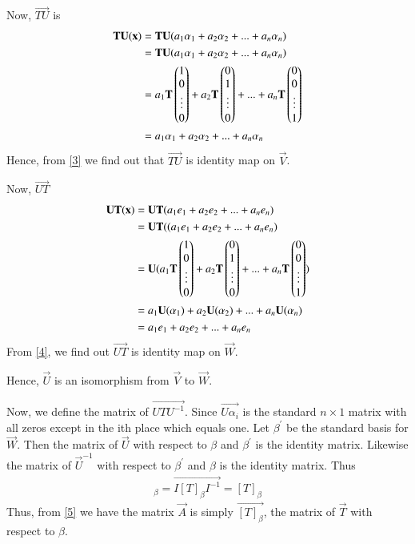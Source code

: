\documentclass[journal,12pt,twocolumn]{IEEEtran}
\begin{document}
Now, $\vec{TU}$ is
\begin{align}
\mathbf{TU(x)} & = \mathbf{TU}(a_1\alpha_{1} + a_2\alpha_{2} + ... + a_n\alpha_{n}) \\
            & = \mathbf{T}\mathbf{U}(a_1\alpha_{1} + a_2\alpha_{2} + ... + a_n\alpha_{n}) \\ 
            & = a_1\mathbf{T}\begin{pmatrix}1 \\ 0 \\ \vdots \\0\end{pmatrix} + a_2\mathbf{T}\begin{pmatrix}0 \\ 1 \\ \vdots \\0\end{pmatrix} + ... + a_n\mathbf{T}\begin{pmatrix}0 \\ 0 \\ \vdots \\1\end{pmatrix} \\
            & = a_1\alpha_{1} + a_2\alpha_{2} + ... + a_n\alpha_{n} \label{3}
\end{align}
Hence, from \eqref{3} we find out that $\vec{TU}$ is identity map on $\vec{V}$.

Now,  $\vec{UT}$
\begin{align}
\mathbf{UT(x)} & = \mathbf{UT}(a_1e_1 + a_2e_2 + ... + a_ne_n)\\
            & = \mathbf{U}\mathbf{T}((a_1e_1 + a_2e_2 + ... + a_ne_n)\\
            & = \mathbf{U}(a_1\mathbf{T}\begin{pmatrix}1 \\ 0 \\ \vdots \\ 0 \end{pmatrix} + a_2\mathbf{T}\begin{pmatrix}0 \\ 1 \\ \vdots \\ 0 \end{pmatrix} + ... + a_n\mathbf{T}\begin{pmatrix}0 \\ 0 \\ \vdots \\ 1 \end{pmatrix}) \\
            & = a_1\mathbf{U}(\alpha_{1}) + a_2\mathbf{U}(\alpha_{2}) + ... + a_n\mathbf{U}(\alpha_{n}) \\
            & = a_1e_1 + a_2e_2 + ... + a_ne_n \label{4}
\end{align}
From \eqref{4}, we find out $\vec{UT}$ is identity map on $\vec{W}$.

Hence, $\vec{U}$ is an isomorphism from $\vec{V}$ to $\vec{W}$.

Now, we define the matrix of $\vec{UTU^{-1}}$. Since $\vec{U\alpha_{i}}$ is the standard $n \times 1$ matrix with all zeros except in the ith place which equals one. Let $\beta^{'}$ be the standard basis for $\vec{W}$. Then the matrix of $\vec{U}$ with respect to $\beta$ and $\beta^{'}$ is the identity matrix. Likewise the matrix of $\vec{U}^{-1}$ with respect to $\beta^{'}$ and $\beta$ is the identity matrix. Thus
\begin{align}
[\vec{UTU^{-1}}]_\beta = \vec{I[T]_\beta I^{-1}} = [T]_\beta \label{5}
\end{align} 
Thus, from \eqref{5} we have the matrix $\vec{A}$ is simply $\vec{[T]_\beta}$, the matrix of $\vec{T}$ with respect to $\beta$.
\end{document}
